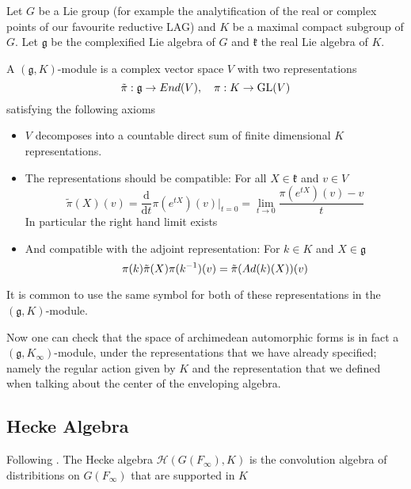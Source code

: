 \begin{definition}
    Let \(G\) be a Lie group (for example the analytification of the real or complex points of our favourite reductive LAG) and \(K\) be a maximal compact subgroup of \(G\). Let \(\mathfrak{g}\) be the complexified Lie algebra of \(G\) and \(\mathfrak{k}\) the real Lie algebra of \(K\). 
    
    A \((\mathfrak{g}, K)\)-module is a complex vector space \(V\) with two representations 
    \[\tilde{\pi}: \mathfrak{g} \to End(V), \quad \pi: K\to \operatorname{GL}(V)\]
    satisfying the following axioms
    \begin{itemize}
        \item \(V\) decomposes into a countable direct sum of finite dimensional \(K\) representations.
        \item The representations should be compatible: For all \(X \in \mathfrak{k}\) and \(v\in V\)
        \[\tilde{\pi}(X)(v) = \frac{\mathrm{d}}{\mathrm{d}t}\pi(e^{tX})(v)|_{t=0} = \lim_{t\to 0}\frac{\pi(e^{tX})(v) - v}{t}\]
        In particular the right hand limit exists
        \item And compatible with the adjoint representation: For \(k\in K\) and \(X\in \mathfrak{g}\) 
         \[\pi(k)\tilde{\pi}(X) \pi(k^{-1} )(v) = \tilde{\pi}(Ad(k)(X))(v)\]
    \end{itemize}
\end{definition}

\begin{remark}
    It is common to use the same symbol for both of these representations in the \((\mathfrak{g}, K)\)-module.
\end{remark}
Now one can check  that the space of archimedean automorphic forms is in fact a \((\mathfrak{g}, K_\infty)\)-module, under the representations that we have already specified; namely the regular action given by \(K\) and the representation that we defined when talking about the center of the enveloping algebra.

\subsection{Hecke Algebra}
Following \cite[as above..]{borelAutomorphicFormsRepresentations1979} .
The Hecke algebra \(\mathcal{H}(G(F_\infty), K)\) is the convolution algebra of distribitions on \(G(F_\infty)\) that are supported in \(K\)

